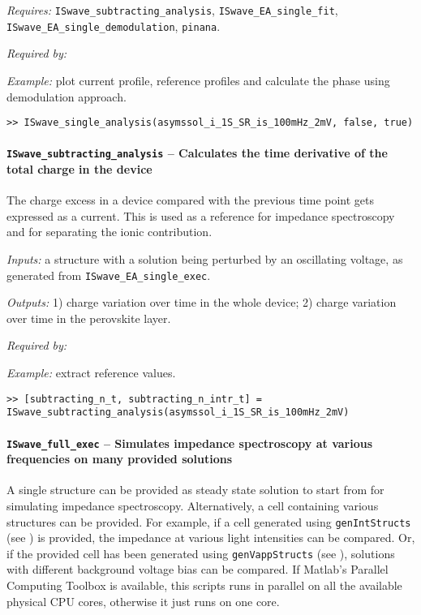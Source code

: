 \textit{Requires:} \texttt{ISwave\_subtracting\_analysis}, \texttt{ISwave\_EA\_single\_fit}, \texttt{ISwave\_EA\_single\_demodulation}, \texttt{pinana}.

\textit{Required by:} 

\textit{Example:} plot current profile, reference profiles and calculate the phase using demodulation approach.
\begin{lstlisting}[style=Matlab-editor]
>> ISwave_single_analysis(asymssol_i_1S_SR_is_100mHz_2mV, false, true)
\end{lstlisting}

\paragraph{\texttt{ISwave\_subtracting\_analysis} -- Calculates the time derivative of the total charge in the device}
The charge excess in a device compared with the previous time point gets expressed as a current.
This is used as a reference for impedance spectroscopy and for separating the ionic contribution.

\textit{Inputs:} a structure with a solution being perturbed by an
oscillating voltage, as generated from \texttt{ISwave\_EA\_single\_exec}.

\textit{Outputs:} 1) charge variation over time in the whole device;
2) charge variation over time in the perovskite layer.


\textit{Required by:} 

\textit{Example:} extract reference values.
\begin{lstlisting}[style=Matlab-editor]
>> [subtracting_n_t, subtracting_n_intr_t] = ISwave_subtracting_analysis(asymssol_i_1S_SR_is_100mHz_2mV)
\end{lstlisting}

\paragraph{\texttt{ISwave\_full\_exec} -- Simulates impedance spectroscopy at various frequencies on many provided solutions}
A single structure can be provided as steady state solution to start from for simulating impedance spectroscopy.
Alternatively, a cell containing various structures can be provided.
For example, if a cell generated using \texttt{gen\-Int\-Structs} (see ) is provided, the impedance at various light intensities can be compared.
Or, if the provided cell has been generated using \texttt{gen\-Vapp\-Structs} (see ), solutions with different background voltage bias can be compared.
If Matlab's Parallel Computing Toolbox is available, this scripts runs in parallel on all the available physical CPU cores, otherwise it just runs on one core.

